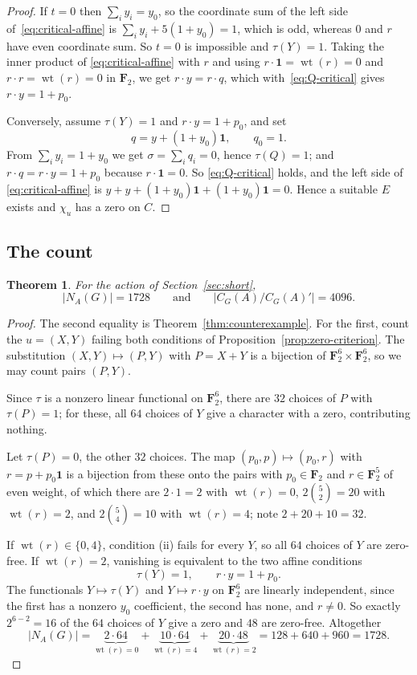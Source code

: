 \documentclass[11pt,a4paper,reqno]{amsart}
\newtheorem{theorem}{Theorem}[section]
\theoremstyle{definition}
\theoremstyle{remark}
\newcommand{\F}{\mathbf F}
\newcommand{\wt}{\operatorname{wt}}
\newcommand{\one}{\mathbf 1}
\begin{document}
\begin{proof}
If $t=0$ then $\sum_iy_i=y_0$, so the coordinate sum of the left side
of~\eqref{eq:critical-affine} is $\sum_iy_i+5(1+y_0)=1$, which is odd,
whereas $0$ and $r$ have even coordinate sum.  So $t=0$ is impossible
and $\tau(Y)=1$.  Taking the inner product of
\eqref{eq:critical-affine} with $r$ and using
$r\cdot\one=\wt(r)=0$ and $r\cdot r=\wt(r)=0$ in $\F_2$, we get
$r\cdot y=r\cdot q$, which with~\eqref{eq:Q-critical} gives
$r\cdot y=1+p_0$.

Conversely, assume $\tau(Y)=1$ and $r\cdot y=1+p_0$, and set
\[
 q=y+(1+y_0)\one,\qquad q_0=1 .
\]
From $\sum_iy_i=1+y_0$ we get $\sigma=\sum_iq_i=0$, hence
$\tau(Q)=1$; and $r\cdot q=r\cdot y=1+p_0$ because $r\cdot\one=0$.  So
\eqref{eq:Q-critical} holds, and the left side of
\eqref{eq:critical-affine} is $y+y+(1+y_0)\one+(1+y_0)\one=0$.  Hence a
suitable $E$ exists and $\chi_u$ has a zero on $C$.
\end{proof}

\subsection*{The count}\label{sec:count}

\begin{theorem}\label{thm:count}
For the action of Section~\ref{sec:short},
\[
 |N_A(G)|=1728
 \qquad\text{and}\qquad
 |C_G(A)/C_G(A)'|=4096 .
\]
\end{theorem}

\begin{proof}
The second equality is Theorem~\ref{thm:counterexample}.  For the
first, count the $u=(X,Y)$ failing both conditions of
Proposition~\ref{prop:zero-criterion}.  The substitution
$(X,Y)\mapsto(P,Y)$ with $P=X+Y$ is a bijection of
$\F_2^6\times\F_2^6$, so we may count pairs $(P,Y)$.

Since $\tau$ is a nonzero linear functional on $\F_2^6$, there are $32$
choices of $P$ with $\tau(P)=1$; for these, all $64$ choices of $Y$
give a character with a zero, contributing nothing.

Let $\tau(P)=0$, the other $32$ choices.  The map
$(p_0,p)\mapsto(p_0,r)$ with $r=p+p_0\one$ is a bijection from these
onto the pairs with $p_0\in\F_2$ and $r\in\F_2^5$ of even weight, of
which there are $2\cdot1=2$ with $\wt(r)=0$, $2\binom52=20$ with
$\wt(r)=2$, and $2\binom54=10$ with $\wt(r)=4$; note $2+20+10=32$.

If $\wt(r)\in\{0,4\}$, condition (ii) fails for every $Y$, so all $64$
choices of $Y$ are zero-free.  If $\wt(r)=2$, vanishing is equivalent
to the two affine conditions
\[
 \tau(Y)=1,\qquad r\cdot y=1+p_0 .
\]
The functionals $Y\mapsto\tau(Y)$ and $Y\mapsto r\cdot y$ on $\F_2^6$
are linearly independent, since the first has a nonzero $y_0$
coefficient, the second has none, and $r\neq0$.  So exactly
$2^{6-2}=16$ of the $64$ choices of $Y$ give a zero and $48$ are
zero-free.  Altogether
\[
 |N_A(G)|=\underbrace{2\cdot64}_{\wt(r)=0}
 +\underbrace{10\cdot64}_{\wt(r)=4}
 +\underbrace{20\cdot48}_{\wt(r)=2}
 =128+640+960=1728 .
\]
\end{proof}
\end{document}
